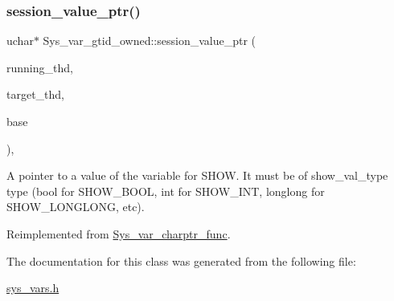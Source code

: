 \subsubsection{\texorpdfstring{session\+\_\+value\+\_\+ptr()}{session\_value\_ptr()}}
{\footnotesize\ttfamily uchar$\ast$ Sys\+\_\+var\+\_\+gtid\+\_\+owned\+::session\+\_\+value\+\_\+ptr (\begin{DoxyParamCaption}\item[{T\+HD $\ast$}]{running\+\_\+thd,  }\item[{T\+HD $\ast$}]{target\+\_\+thd,  }\item[{L\+E\+X\+\_\+\+S\+T\+R\+I\+NG $\ast$}]{base }\end{DoxyParamCaption})\hspace{0.3cm}{\ttfamily [inline]}, {\ttfamily [virtual]}}

A pointer to a value of the variable for S\+H\+OW. It must be of show\+\_\+val\+\_\+type type (bool for S\+H\+O\+W\+\_\+\+B\+O\+OL, int for S\+H\+O\+W\+\_\+\+I\+NT, longlong for S\+H\+O\+W\+\_\+\+L\+O\+N\+G\+L\+O\+NG, etc). 

Reimplemented from \mbox{\hyperlink{classSys__var__charptr__func_a80990cda2c596f6dc20e9b63a2a3cb4b}{Sys\+\_\+var\+\_\+charptr\+\_\+func}}.



The documentation for this class was generated from the following file\+:\begin{DoxyCompactItemize}
\item 
\mbox{\hyperlink{sys__vars_8h}{sys\+\_\+vars.\+h}}\end{DoxyCompactItemize}

